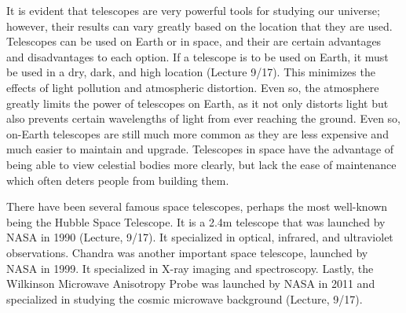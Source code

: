\documentclass[12pt]{article}
\begin{document}
It is evident that telescopes are very powerful tools for studying our universe;
however, their results can vary greatly based on the location that they are
used.  Telescopes can be used on Earth or in space, and their are certain
advantages and disadvantages to each option.  If a telescope is to be used on
Earth, it must be used in a dry, dark, and high location (Lecture 9/17).  This
minimizes the effects of light pollution and atmospheric distortion.  Even so,
the atmosphere greatly limits the power of telescopes on Earth, as it not only
distorts light but also prevents certain wavelengths of light from ever reaching
the ground.  Even so, on-Earth telescopes are still much more common as they are
less expensive and much easier to maintain and upgrade.  Telescopes in space
have the advantage of being able to view celestial bodies more clearly, but lack
the ease of maintenance which often deters people from building them.

There have been several famous space telescopes, perhaps the most well-known
being the Hubble Space Telescope.  It is a 2.4m telescope that was launched by
NASA in 1990 (Lecture, 9/17).  It specialized in optical, infrared, and ultraviolet
observations.  Chandra was another important space telescope, launched by NASA
in 1999.  It specialized in X-ray imaging and spectroscopy.  Lastly,  the
Wilkinson Microwave Anisotropy Probe was launched by NASA in 2011 and
specialized in studying the cosmic microwave background (Lecture, 9/17).
\end{document}

